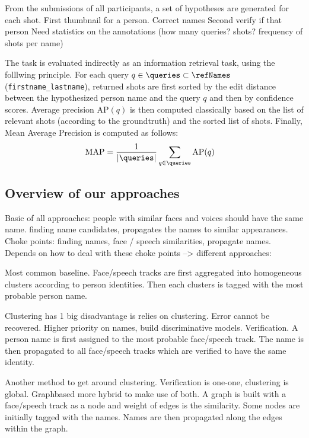 From the submissions of all participants, a set of hypotheses are generated for each shot. 
%
First thumbnail for a person. Correct names 
%
Second verify if that person 
%
Need statistics on the annotations (how many queries? shots? frequency of shots per name)

 The task is evaluated indirectly as an information retrieval task, using the folllwing principle.
%
For each query $q \in \queries \subset \refNames$ (\texttt{first\-name\_lastname}), returned shots are first sorted by the edit distance between the hypothesized person name and the query $q$ and then by confidence scores.
Average precision $\text{AP}(q)$ is then computed classically based on the list of relevant shots (according to the groundtruth) and the sorted list of shots. Finally, Mean Average Precision is computed as follows:
\begin{align}
            \text{MAP} & = \frac{1}{|\queries|} \sum_{q \in \queries} \text{AP}(q) \nonumber
\end{align}

\subsection{Overview of our approaches}

Basic of all approaches: people with similar faces and voices should have the same name. finding name candidates, propagates the names to similar appearances. Choke points: finding names, face / speech similarities, propagate names. Depends on how to deal with these choke points --> different approaches:

Most common baseline. Face/speech tracks are first aggregated into homogeneous clusters according to person identities. Then each clusters is tagged with the most probable person name.

Clustering has 1 big disadvantage is relies on clustering. Error cannot be recovered. Higher priority on names, build discriminative models.
Verification.
A person name is first assigned to the most probable face/speech track. The name is then propagated to all face/speech tracks which are verified to have the same identity.

 Another method to get around clustering. Verification is one-one, clustering is global. Graphbased more hybrid to make use of both.
A graph is built with a face/speech track as a node and weight of edges is the similarity. Some nodes are initially tagged with the names. Names are then propagated along the edges within the graph.

